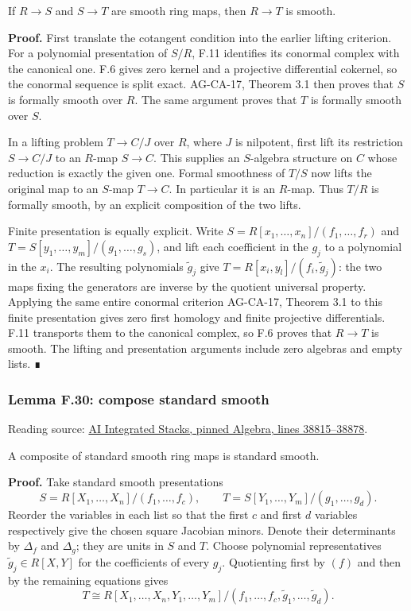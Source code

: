 \documentclass[11pt,a4paper,openany]{report}
\begin{document}
If \(R\to S\) and \(S\to T\) are smooth ring maps, then \(R\to T\) is smooth.

\textbf{Proof.} First translate the cotangent condition into the earlier lifting criterion. For a polynomial presentation of \(S/R\), F.11 identifies its conormal complex with the canonical one. F.6 gives zero kernel and a projective differential cokernel, so the conormal sequence is split exact. AG-CA-17, Theorem 3.1 then proves that \(S\) is formally smooth over \(R\). The same argument proves that \(T\) is formally smooth over \(S\).

In a lifting problem \(T\to C/J\) over \(R\), where \(J\) is nilpotent, first lift its restriction \(S\to C/J\) to an \(R\)-map \(S\to C\). This supplies an \(S\)-algebra structure on \(C\) whose reduction is exactly the given one. Formal smoothness of \(T/S\) now lifts the original map to an \(S\)-map \(T\to C\). In particular it is an \(R\)-map. Thus \(T/R\) is formally smooth, by an explicit composition of the two lifts.

Finite presentation is equally explicit. Write \(S=R[x_1,\ldots,x_n]/(f_1,\ldots,f_r)\) and \(T=S[y_1,\ldots,y_m]/(g_1,\ldots,g_s)\), and lift each coefficient in the \(g_j\) to a polynomial in the \(x_i\). The resulting polynomials \(\widetilde g_j\) give \(T=R[x_i,y_l]/(f_i,\widetilde g_j)\): the two maps fixing the generators are inverse by the quotient universal property. Applying the same entire conormal criterion AG-CA-17, Theorem 3.1 to this finite presentation gives zero first homology and finite projective differentials. F.11 transports them to the canonical complex, so F.6 proves that \(R\to T\) is smooth. The lifting and presentation arguments include zero algebras and empty lists. ∎

\label{AG-RG-S05-algebra-lemma-compose-standard-smooth}

\subsubsection{Lemma F.30: compose standard smooth}\label{AG-RG-S05-lemma-f.30-compose-standard-smooth}

Reading source: \href{https://github.com/KokunoYumeto/unofficial-stacks-project-ai-drafts/blob/565b10e987aba5969b21145a0833f42d69f96790/algebra.tex\#L38815-L38878}{AI Integrated Stacks, pinned Algebra, lines 38815--38878}.

A composite of standard smooth ring maps is standard smooth.

\textbf{Proof.} Take standard smooth presentations \[S=R[X_1,\ldots,X_n]/(f_1,\ldots,f_c),\qquad
T=S[Y_1,\ldots,Y_m]/(g_1,\ldots,g_d).\] Reorder the variables in each list so that the first \(c\) and first \(d\) variables respectively give the chosen square Jacobian minors. Denote their determinants by \(\Delta_f\) and \(\Delta_g\); they are units in \(S\) and \(T\). Choose polynomial representatives \(\widetilde g_j\in R[X,Y]\) for the coefficients of every \(g_j\). Quotienting first by \((f)\) and then by the remaining equations gives \[T\cong R[X_1,\ldots,X_n,Y_1,\ldots,Y_m]/
(f_1,\ldots,f_c,\widetilde g_1,\ldots,\widetilde g_d).\]
\end{document}
